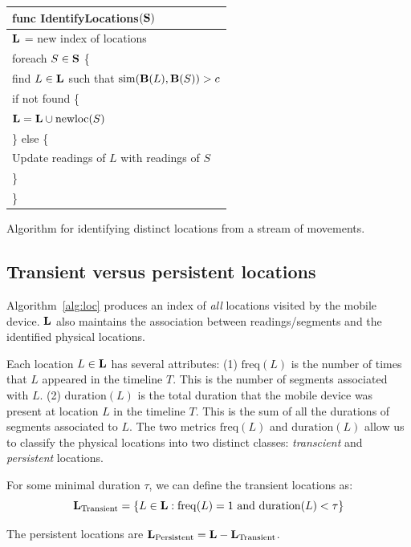 \begin{algorithm}[h]
    \centering
\begin{tabular}{|l|} \hline
    func IdentifyLocations$(\mathbf{S})$ \\ \hline
    $\mathbf{L}$ = new index of locations \\
    foreach $S\in\mathbf{S}$ \{ \\
        \RRR find $L\in\mathbf{L}$ such that $\mathrm{sim}(\mathbf{B}(L), \mathbf{B}(S)) > c$ \\
        \RRR if not found \{ \\
        \RRR \RRR $\mathbf{L} = \mathbf{L}\cup \mathrm{newloc}(S)$ \\
        \RRR \} else \{ \\
        \RRR \RRR Update readings of $L$ with readings of $S$ \\
        \RRR \} \\
    \}\\ \hline
\end{tabular}
\vspace{0.4cm}
\caption{Algorithm for identifying distinct locations from a stream of
movements.}
\label{alg:loc}
\end{algorithm}

\subsection{Transient versus persistent locations}

Algorithm~\ref{alg:loc} produces an index of {\em all} locations visited by the
mobile device.  $\mathbf{L}$ also maintains the association between readings/segments
and the identified physical locations.

Each location $L\in\mathbf{L}$ has several attributes:
(1) $\mathrm{freq}(L)$ is the number of times that $L$ appeared in the timeline $T$.  This is the number of segments associated with $L$.
(2) $\mathrm{duration}(L)$ is the total duration that the mobile device was present at location $L$ in the timeline $T$.  This is the sum of all the durations of segments associated to $L$.
The two metrics $\mathrm{freq}(L)$ and $\mathrm{duration}(L)$ allow us to
classify the physical locations into two distinct classes: {\em transcient} and
{\em persistent} locations.

For some minimal duration $\tau$, we can define the transient locations as:
$$\mathbf{L}_\mathrm{Transient} = \{ L\in \mathbf{L} :
    \mathrm{freq}(L) = 1\ \mathrm{and}\ \mathrm{duration}(L) < \tau
\}$$

The persistent locations are $\mathbf{L}_\mathrm{Persistent} = \mathbf{L} -
\mathbf{L}_\mathrm{Transient}$.

